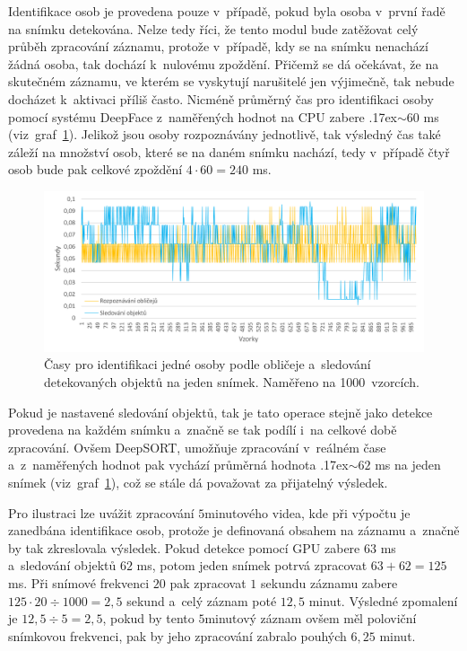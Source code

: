 Identifikace osob je provedena pouze v~případě, pokud byla osoba v~první řadě na snímku detekována. Nelze tedy říci, že tento modul bude zatěžovat celý průběh zpracování záznamu, protože v~případě, kdy se na snímku nenachází žádná osoba, tak dochází k~nulovému zpoždění. Přičemž se dá očekávat, že na skutečném záznamu, ve kterém se vyskytují narušitelé jen výjimečně, tak nebude docházet k~aktivaci příliš často. Nicméně průměrný čas pro identifikaci osoby pomocí systému DeepFace z~naměřených hodnot na CPU zabere {\raise.17ex\hbox{$\scriptstyle\sim$}}$60$ ms (viz~graf~\ref{img:cpuTimes}). Jelikož jsou osoby rozpoznávány jednotlivě, tak výsledný čas také záleží na množství osob, které se na daném snímku nachází, tedy v~případě čtyř osob bude pak celkové zpoždění $4 \cdot 60 = 240$ ms.

\begin{figure}[hbt]
	\centering
	\setlength{\fboxsep}{0pt}
	\includegraphics[width=1.0\textwidth]{obrazky-figures/recognition_tracking_times.pdf}
	\caption{Časy pro identifikaci jedné osoby podle obličeje a~sledování detekovaných objektů na jeden snímek. Naměřeno na 1000~vzorcích.}
	\label{img:cpuTimes}
\end{figure}

Pokud je nastavené sledování objektů, tak je tato operace stejně jako detekce provedena na každém snímku a~značně se tak podílí i~na celkové době zpracování. Ovšem DeepSORT, umožňuje zpracování v~reálném čase a~z~naměřených hodnot pak vychází průměrná hodnota {\raise.17ex\hbox{$\scriptstyle\sim$}}$62$ ms na jeden snímek (viz~graf~\ref{img:cpuTimes}), což se stále dá považovat za přijatelný výsledek.

Pro ilustraci lze uvážit zpracování $5$minutového videa, kde při výpočtu je zanedbána identifikace osob, protože je definovaná obsahem na záznamu a~značně by tak zkreslovala výsledek. Pokud detekce pomocí GPU zabere $63$ ms a~sledování objektů $62$ ms, potom jeden snímek potrvá zpracovat $63 + 62 = 125$ ms. Při snímové frekvenci $20$ pak zpracovat $1$ sekundu záznamu zabere $125 \cdot 20 \div 1000 = 2,5$ sekund a~celý záznam poté $12,5$ minut. Výsledné zpomalení je $12,5 \div 5 = 2,5$, pokud by tento $5$minutový záznam ovšem měl poloviční snímkovou frekvenci, pak by jeho zpracování zabralo pouhých $6,25$ minut.

